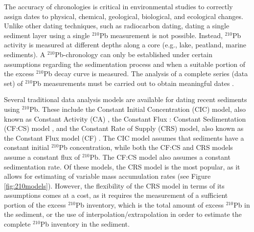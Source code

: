 \documentclass [10pt] {article}
\begin{document}
	The accuracy of chronologies is critical in environmental studies to correctly assign dates to physical, chemical, geological, biological, and ecological changes. Unlike other dating techniques, such as radiocarbon dating, dating a single sediment layer using a single $^{210}$Pb measurement is not possible. Instead, $^{210}$Pb activity is measured at different depths along a core (e.g., lake, peatland, marine sediments). A $^{210}$Pb-chronology can only be established under certain assumptions regarding the sedimentation process and when a suitable portion of the excess $^{210}$Pb decay curve is measured. The analysis of a complete series (data set) of $^{210}$Pb measurements must be carried out to obtain meaningful dates \citet{Aquino2018}.




Several traditional data analysis models are available for dating recent sediments using $^{210}$Pb. These include the Constant Initial Concentration (CIC) model, also known as Constant Activity (CA) \citep{Goldberg1963, Robbins1975}, the Constant Flux : Constant Sedimentation (CF:CS) model \citep{Crozaz1964}, and the Constant Rate of Supply (CRS) model, also known as the Constant Flux model (CF) \citep{Appleby1978, Robbins1978, Sanchez-Cabeza2012}. The CIC model assumes that sediments have a constant initial $^{210}$Pb concentration, while both the CF:CS and CRS models assume a constant flux of $^{210}$Pb. The CF:CS model also assumes a constant sedimentation rate. Of these models, the CRS model is the most popular, as it allows for estimating of variable mass accumulation rates (see Figure \ref{fig:210models}). However, the flexibility of the CRS model in terms of its assumptions comes at a cost, as it requires the measurement of a sufficient portion of the excess $^{210}$Pb inventory, which is the total amount of excess $^{210}$Pb in the sediment, or the use of interpolation/extrapolation in order to estimate the complete $^{210}$Pb inventory in the sediment.
\end{document}
